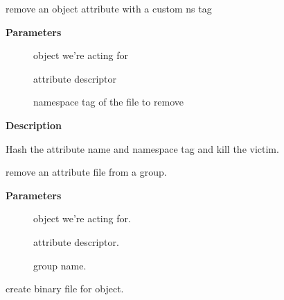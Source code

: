 \documentclass[a4paper,8pt,english]{sphinxmanual}
\begin{document}
\begin{fulllineitems}
\label{filesystems/index:c.sysfs_remove_file_ns}
remove an object attribute with a custom ns tag

\end{fulllineitems}


\textbf{Parameters}
\begin{description}
\item[{}] \leavevmode
object we're acting for

\item[{}] \leavevmode
attribute descriptor

\item[{}] \leavevmode
namespace tag of the file to remove

\end{description}

\textbf{Description}

Hash the attribute name and namespace tag and kill the victim.

\begin{fulllineitems}
\label{filesystems/index:c.sysfs_remove_file_from_group}
remove an attribute file from a group.

\end{fulllineitems}


\textbf{Parameters}
\begin{description}
\item[{}] \leavevmode
object we're acting for.

\item[{}] \leavevmode
attribute descriptor.

\item[{}] \leavevmode
group name.

\end{description}

\begin{fulllineitems}
\label{filesystems/index:c.sysfs_create_bin_file}
create binary file for object.

\end{fulllineitems}
\end{document}
